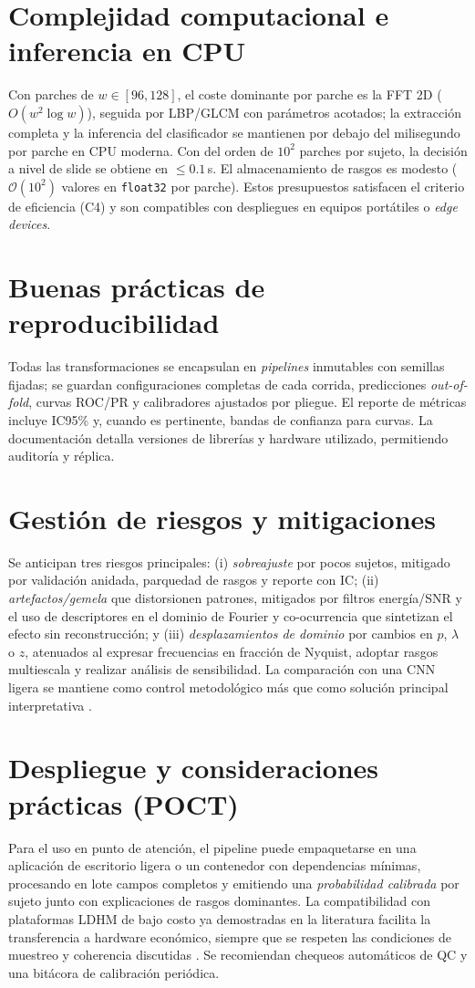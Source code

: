 \section*{Complejidad computacional e inferencia en CPU}
Con parches de $w\in[96,128]$, el coste dominante por parche es la FFT 2D ($O(w^2\log w)$), seguida por LBP/GLCM con parámetros acotados; la extracción completa y la inferencia del clasificador se mantienen por debajo del milisegundo por parche en CPU moderna. Con del orden de $10^2$ parches por sujeto, la decisión a nivel de slide se obtiene en $\leq 0.1$\,s. El almacenamiento de rasgos es modesto ($\mathcal{O}(10^2)$ valores en \texttt{float32} por parche). Estos presupuestos satisfacen el criterio de eficiencia (C4) y son compatibles con despliegues en equipos portátiles o \emph{edge devices}.

\section*{Buenas prácticas de reproducibilidad}
Todas las transformaciones se encapsulan en \emph{pipelines} inmutables con semillas fijadas; se guardan configuraciones completas de cada corrida, predicciones \emph{out-of-fold}, curvas ROC/PR y calibradores ajustados por pliegue. El reporte de métricas incluye IC95\% y, cuando es pertinente, bandas de confianza para curvas. La documentación detalla versiones de librerías y hardware utilizado, permitiendo auditoría y réplica.

\section*{Gestión de riesgos y mitigaciones}
Se anticipan tres riesgos principales: (i) \emph{sobreajuste} por pocos sujetos, mitigado por validación anidada, parquedad de rasgos y reporte con IC; (ii) \emph{artefactos/gemela} que distorsionen patrones, mitigados por filtros energía/SNR y el uso de descriptores en el dominio de Fourier y co-ocurrencia que sintetizan el efecto sin reconstrucción; y (iii) \emph{desplazamientos de dominio} por cambios en $p$, $\lambda$ o $z$, atenuados al expresar frecuencias en fracción de Nyquist, adoptar rasgos multiescala y realizar análisis de sensibilidad. La comparación con una CNN ligera se mantiene como control metodológico más que como solución principal interpretativa \cite{Alzubaidi2020Electronics}.

\section*{Despliegue y consideraciones prácticas (POCT)}
Para el uso en punto de atención, el pipeline puede empaquetarse en una aplicación de escritorio ligera o un contenedor con dependencias mínimas, procesando en lote campos completos y emitiendo una \emph{probabilidad calibrada} por sujeto junto con explicaciones de rasgos dominantes. La compatibilidad con plataformas LDHM de bajo costo ya demostradas en la literatura facilita la transferencia a hardware económico, siempre que se respeten las condiciones de muestreo y coherencia discutidas \cite{Amann2019SciRep,BuitragoDuque2023HardwareX,Greenbaum2014STM}. Se recomiendan chequeos automáticos de QC y una bitácora de calibración periódica.

